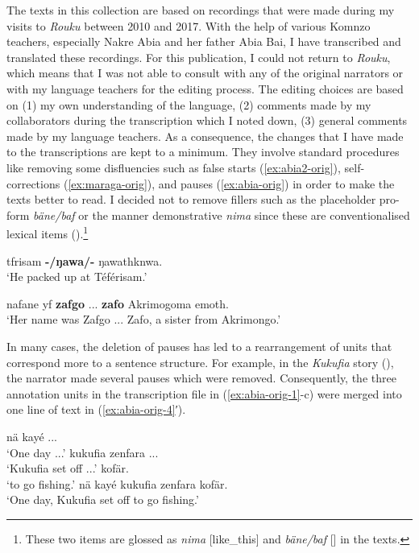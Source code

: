 The texts in this collection are based on recordings that were made during my visits to \textit{Rouku} between 2010 and 2017. With the help of various Komnzo teachers, especially Nakre Abia and her father Abia Bai, I have transcribed and translated these recordings. For this publication, I could not return to \textit{Rouku}, which means that I was not able to consult with any of the original narrators or with my language teachers for the editing process. The editing choices are based on (1) my own understanding of the language, (2) comments made by my collaborators during the transcription which I noted down, (3) general comments made by my language teachers. As a consequence, the changes that I have made to the transcriptions are kept to a minimum. They involve standard procedures like removing some disfluencies such as false starts (\ref{ex:abia2-orig}), self-corrections (\ref{ex:maraga-orig}), and pauses (\ref{ex:abia-orig}) in order to make the texts better to read. I decided not to remove fillers such as the placeholder pro-form \textit{bäne/baf} or the manner demonstrative \textit{nima} since these are conventionalised lexical items (\cite{Dohler:0wb}).\footnote{These two items are glossed as \textit{nima} [like\_this] and \textit{bäne/baf} [] in the texts.}

\ea 
    \label{ex:abia2-orig}
    tfrisam \textbf{-/ŋawa/-} ŋawathknwa.\\
    \glt `He packed up at Téférisam.' 
\z

\ea 
    \label{ex:maraga-orig}
    nafane yf \textbf{zafgo} ... \textbf{zafo} Akrimogoma emoth.\\
    \glt `Her name was Zafgo ... Zafo, a sister from Akrimongo.' 
\z

In many cases, the deletion of pauses has led to a rearrangement of units that correspond more to a sentence structure. For example, in the \textit{Kukufia} story (), the narrator made several pauses which were removed. Consequently, the three annotation units in the transcription file in (\ref{ex:abia-orig-1}-c) were merged into one line of text in (\ref{ex:abia-orig-4}′).

\ea 
    \label{ex:abia-orig}
    \ea
        \label{ex:abia-orig-1}
        nä kayé ...\\
        \glt `One day ...' 
    \ex
        \label{ex:abia-orig-2}
        kukufia zenfara ...\\
        \glt `Kukufia set off ...' 
    \ex
        \label{ex:abia-orig-3}
        kofär.\\
        \glt `to go fishing.'         
    \z
{}\label{ex:abia-orig-4}
    nä kayé kukufia zenfara kofär.\\
    \glt `One day, Kukufia set off to go fishing.' 
\z 
    
